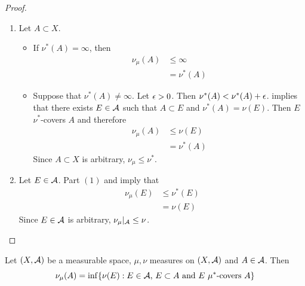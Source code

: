 \documentclass{book}
\begin{document}
	\begin{proof}\
		\begin{enumerate}
			\item Let $A \subset X$. 
			\begin{itemize}
				\item If $\nu^*(A) = \infty$, then 
				\begin{align*}
					\nu_{\mu}(A)
					& \leq \infty \\
					& = \nu^*(A)
				\end{align*}
				\item Suppose that $\nu^*(A) \neq \infty$. Let $\epsilon > 0$. Then $\nu^*(A) < \nu^*(A) + \epsilon$.  implies that there exists $E \in \mathcal{A}$ such that $A \subset E $ and $\nu^*(A) = \nu(E)$. Then $E$ $\nu^*$-covers $A$ and therefore
				\begin{align*}
					\nu_{\mu}(A)
					& \leq \nu(E) \\
					& = \nu^*(A)
				\end{align*} 
				Since $A \subset X$ is arbitrary, $\nu_{\mu} \leq \nu^*$.
			\end{itemize} 
			\item Let $E \in \mathcal{A}$. Part $(1)$ and  imply that
			\begin{align*}
				\nu_{\mu}(E)
				& \leq \nu^*(E) \\
				& = \nu(E) 
			\end{align*} 
			Since $E \in \mathcal{A}$ is arbitrary, $\nu_{\mu}|_{\mathcal{A}} \leq \nu$.
		\end{enumerate}
	\end{proof}

	\begin{ex}  
		Let $(X, \mathcal{A})$ be a measurable space, $\mu, \nu$ measures on $(X, \mathcal{A})$ and $A \in \mathcal{A}$. Then 
		$$\nu_{\mu}(A) = \inf\{\text{$ \nu(E): E \in \mathcal{A}$, $E \subset A$ and $E$ $\mu^*$-covers $A$} \}$$
	\end{ex}
\end{document}
